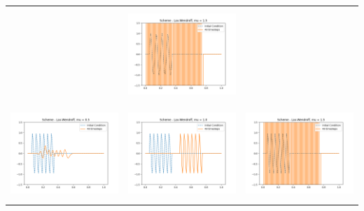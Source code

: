\documentclass[a4paper,twoside,11pt]{article}
\begin{document}
\begin{table}[!h]
\begin{tabular}{ | c | m{5cm} | m{5cm} | }
            &
            \begin{minipage}{.3\textwidth}
              \includegraphics[width=\linewidth, height=3.5cm]{../plots/scheme4-IC3-mu1_5.png}
            \end{minipage} \\
            \begin{minipage}{.3\textwidth}
              \includegraphics[width=\linewidth, height=3.5cm]{../plots/scheme4-IC4-mu0_5.png}
            \end{minipage}
            &
            \begin{minipage}{.3\textwidth}
              \includegraphics[width=\linewidth, height=3.5cm]{../plots/scheme4-IC4-mu1_0.png}
            \end{minipage}
            &
            \begin{minipage}{.3\textwidth}
              \includegraphics[width=\linewidth, height=3.5cm]{../plots/scheme4-IC4-mu1_5.png}
            \end{minipage} \\

\end{tabular}
\end{table}
\end{document}
